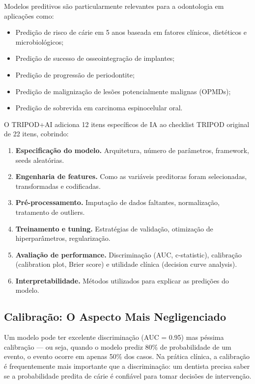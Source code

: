 Modelos preditivos são particularmente relevantes para a odontologia em aplicações como:
\begin{itemize}
    \item Predição de risco de cárie em 5 anos baseada em fatores clínicos, dietéticos e microbiológicos;
    \item Predição de sucesso de osseointegração de implantes;
    \item Predição de progressão de periodontite;
    \item Predição de malignização de lesões potencialmente malignas (OPMDs);
    \item Predição de sobrevida em carcinoma espinocelular oral.
\end{itemize}

O TRIPOD+AI adiciona 12 itens específicos de IA ao checklist TRIPOD original de 22 itens, cobrindo:

\begin{enumerate}
    \item \textbf{Especificação do modelo.} Arquitetura, número de parâmetros, framework, seeds aleatórias.
    \item \textbf{Engenharia de features.} Como as variáveis preditoras foram selecionadas, transformadas e codificadas.
    \item \textbf{Pré-processamento.} Imputação de dados faltantes, normalização, tratamento de outliers.
    \item \textbf{Treinamento e tuning.} Estratégias de validação, otimização de hiperparâmetros, regularização.
    \item \textbf{Avaliação de performance.} Discriminação (AUC, c-statistic), calibração (calibration plot, Brier score) e utilidade clínica (decision curve analysis).
    \item \textbf{Interpretabilidade.} Métodos utilizados para explicar as predições do modelo.
\end{enumerate}

\subsection{Calibração: O Aspecto Mais Negligenciado}

Um modelo pode ter excelente discriminação (AUC = 0.95) mas péssima calibração — ou seja, quando o modelo prediz 80\% de probabilidade de um evento, o evento ocorre em apenas 50\% dos casos. Na prática clínica, a calibração é frequentemente mais importante que a discriminação: um dentista precisa saber se a probabilidade predita de cárie é confiável para tomar decisões de intervenção.

